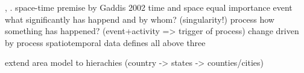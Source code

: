 \cite[p. 268]{knowles2008placing}, \cite[p. xii]{gregory2014toward}.
space-time premise by Gaddis 2002
  time and space equal importance
  event     what significantly has happend and by whom? (singularity!)
  process   how something has happened? (event+activity => trigger of process)
  change    driven by process
  spatiotemporal data defines all above three

extend area model to hierachies (country -> states -> counties/cities)




